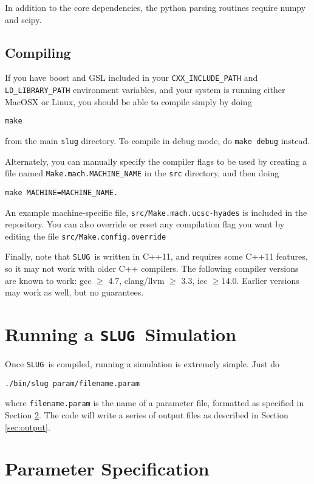\documentclass[12pt]{article}
\newcommand{\slug}{\texttt{SLUG}}
\begin{document}
In addition to the core dependencies, the python parsing routines require numpy and scipy. 

\subsection{Compiling}

If you have boost and GSL included in your \verb=CXX_INCLUDE_PATH= and \verb=LD_LIBRARY_PATH= environment variables, and your system is running either MacOSX or Linux, you should be able to compile simply by doing
\begin{verbatim}
make
\end{verbatim}
from the main \verb=slug= directory. To compile in debug mode, do \verb=make debug= instead.

Alternately, you can manually specify the compiler flags to be used by creating a file named \verb=Make.mach.MACHINE_NAME= in the \verb=src= directory, and then doing
\begin{verbatim}
make MACHINE=MACHINE_NAME.
\end{verbatim}
An example machine-specific file, \verb=src/Make.mach.ucsc-hyades= is included in the repository. You can also override or reset any compilation flag you want by editing the file \verb=src/Make.config.override=

Finally, note that \slug\ is written in C++11, and requires some C++11 features, so it may not work with older C++ compilers. The following compiler versions are known to work: gcc $\geq$ 4.7, clang/llvm $\geq$ 3.3, icc $\geq 14.0$. Earlier versions may work as well, but no guarantees.

\section{Running a \slug\ Simulation}

Once \slug\ is compiled, running a simulation is extremely simple. Just do
\begin{verbatim}
./bin/slug param/filename.param
\end{verbatim}
where \verb=filename.param= is the name of a parameter file, formatted as specified in Section \ref{sec:parameters}. The code will write a series of output files as described in Section \ref{sec:output}.


\section{Parameter Specification}
\label{sec:parameters}
\end{document}
